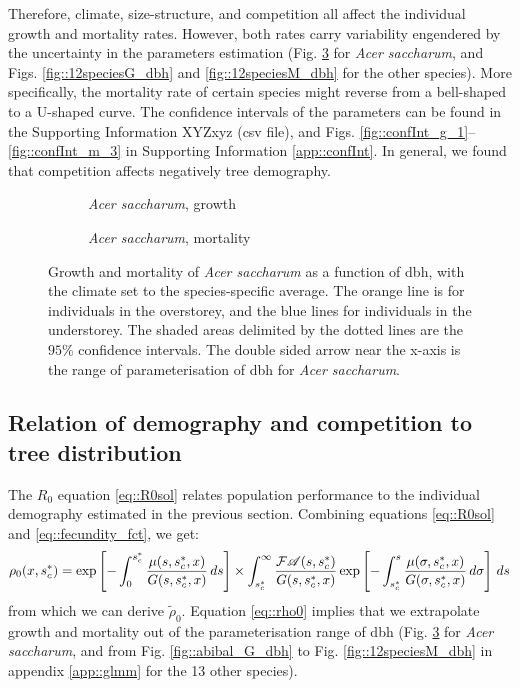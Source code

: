 Therefore, climate, size-structure, and competition all affect the individual
growth and mortality rates. However, both rates carry variability engendered by the uncertainty in the parameters estimation (Fig. \ref{fig::acesac_G_M_dbh} for \textit{Acer saccharum}, and Figs. \ref{fig::12speciesG_dbh} and \ref{fig::12speciesM_dbh} for the other species). More specifically, the mortality rate of certain species might reverse from a bell-shaped to a U-shaped curve. The confidence intervals of the parameters can be found in the Supporting Information XYZxyz (csv file), and Figs. \ref{fig::confInt_g_1}--\ref{fig::confInt_m_3} in Supporting Information \ref{app::confInt}. In general, we found that competition affects negatively tree demography.

\begin{figure}[htb]
	\centering
	\begin{subfigure}{0.48\textwidth}
		
		\caption{\textit{Acer saccharum}, growth}
		\label{fig::acesac_G_dbh}
	\end{subfigure}
	\hfil
	\begin{subfigure}{0.48\textwidth}
		
		\caption{\textit{Acer saccharum}, mortality}
		\label{fig::acesac_M_dbh}
	\end{subfigure}
	\caption{Growth and mortality of \textit{Acer saccharum} as a function of dbh, with the climate set to the species-specific average. The orange line is for individuals in the overstorey, and the blue lines for individuals in the understorey. The shaded areas delimited by the dotted lines are the $ 95 \% $ confidence intervals. The double sided arrow near the x-axis is the range of parameterisation of dbh for \textit{Acer saccharum}.}
	\label{fig::acesac_G_M_dbh}
\end{figure}

\subsection{Relation of demography and competition to tree distribution} %
The $ R_0 $ equation \eqref{eq::R0sol} relates population performance
to the individual demography estimated in the previous section. Combining equations \eqref{eq::R0sol} and \eqref{eq::fecundity_fct}, we get:
\begin{equation} \label{eq::rho0}
	\rho_0(x, {s}^{*}_c) = \exp \left[-\int_0^{{s}^{*}_c}\frac{\mu(s, {s}^{*}_c, x)}{G(s, {s}^{*}_c, x)} \, ds \right] \times \int_{{s}^{*}_c}^{\infty} \frac{\mathcal{F} \mathscr{A}(s, {s}^{*}_c)}{G(s, {s}^{*}_c, x)} \exp \left[-\int_{{s}^{*}_c}^{s} \frac{\mu(\sigma, {s}^{*}_c, x)}{G(\sigma, {s}^{*}_c, x)} \, d\sigma \right] \, ds
\end{equation}
from which we can derive $ \tilde \rho_0 $. Equation \eqref{eq::rho0} implies
that we extrapolate growth and mortality out of the parameterisation range of
dbh (Fig. \ref{fig::acesac_G_M_dbh} for \textit{Acer saccharum}, and from Fig.
\ref{fig::abibal_G_dbh} to Fig. \ref{fig::12speciesM_dbh} in appendix
\ref{app::glmm} for the 13 other species).

